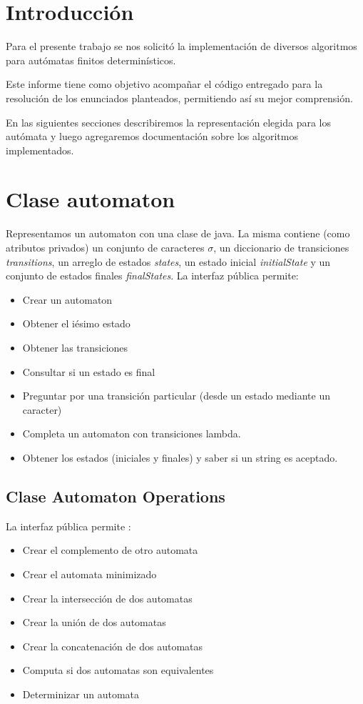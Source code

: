 \documentclass[a4paper]{article}
\begin{document}
\vspace{3cm}

\clearpage


\section{Introducción}
Para el presente trabajo se nos solicitó la implementación de diversos algoritmos para autómatas finitos determinísticos.
\linebreak

Este informe tiene como objetivo acompañar el código entregado para la resolución de los enunciados planteados, permitiendo así su mejor comprensión.\linebreak



En las siguientes secciones describiremos la representación elegida para los autómata y luego agregaremos documentación sobre los algoritmos implementados.


\section{Clase automaton}
Representamos un automaton con una clase de java. La misma contiene (como atributos privados) un conjunto de caracteres $\sigma$, un diccionario de transiciones \textit{transitions}, un arreglo de estados \textit{states}, un estado inicial \textit{initialState} y un conjunto de estados finales \textit{finalStates}.
\linebreak
La interfaz pública permite:
\begin{itemize}
\item Crear un automaton
\item Obtener el iésimo estado
\item Obtener las transiciones
\item Consultar si un estado es final
\item Preguntar por una transición particular (desde un estado mediante un caracter)
\item Completa un automaton con transiciones lambda.
\item Obtener los estados (iniciales y finales) y saber si un string es aceptado.
\end{itemize}


\subsection{Clase Automaton Operations}
La interfaz pública permite :
\begin{itemize}
\item Crear el complemento de otro automata
\item Crear el automata minimizado
\item Crear la intersección de dos automatas
\item Crear la unión de dos automatas
\item Crear la concatenación de dos automatas
\item Computa si dos automatas son equivalentes
\item Determinizar un automata
\end{itemize}
\end{document}
